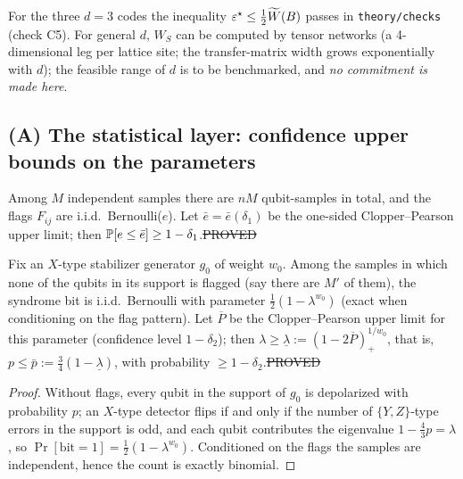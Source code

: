 \noindent For the three $d=3$ codes the inequality $\varepsilon^{\star}\le\tfrac12\widetilde W(B)$ passes in \texttt{theory/checks} (check C5).
For general $d$, $W_S$ can be computed by tensor networks (a 4-dimensional leg per lattice site; the transfer-matrix width grows exponentially with $d$); the feasible range of $d$ is to be benchmarked, and \emph{no commitment is made here}.

\subsection{(A) The statistical layer: confidence upper bounds on the parameters}

\begin{lemma}\label{lem:flags}
Among $M$ independent samples there are $nM$ qubit-samples in total, and the flags $F_{ij}$ are i.i.d.\ Bernoulli($e$). Let
$\bar e=\bar e(\delta_1)$ be the one-sided Clopper--Pearson upper limit; then $\mathbb{P}[e\le\bar e]\ge1-\delta_1$.\hfill\st{PROVED}
\end{lemma}

\begin{lemma}\label{lem:lambda}
Fix an $X$-type stabilizer generator $g_0$ of weight $w_0$. Among the samples in which none of the qubits in its support is flagged (say there are $M'$ of them),
the syndrome bit is i.i.d.\ Bernoulli with parameter $\tfrac12(1-\lambda^{w_0})$ (exact when conditioning on the flag pattern).
Let $\overline{P}$ be the Clopper--Pearson upper limit for this parameter (confidence level $1-\delta_2$); then
$\lambda\ge\underline\lambda:=(1-2\overline P)_+^{1/w_0}$, that is, $p\le\bar p:=\tfrac34(1-\underline\lambda)$,
with probability $\ge1-\delta_2$.\hfill\st{PROVED}
\end{lemma}
\begin{proof}
Without flags, every qubit in the support of $g_0$ is depolarized with probability $p$; an $X$-type detector flips if and only if the number of $\{Y,Z\}$-type errors in the support is odd,
and each qubit contributes the eigenvalue $1-\tfrac43p=\lambda$, so $\Pr[\text{bit}=1]=\tfrac12(1-\lambda^{w_0})$.
Conditioned on the flags the samples are independent, hence the count is exactly binomial.
\end{proof}

